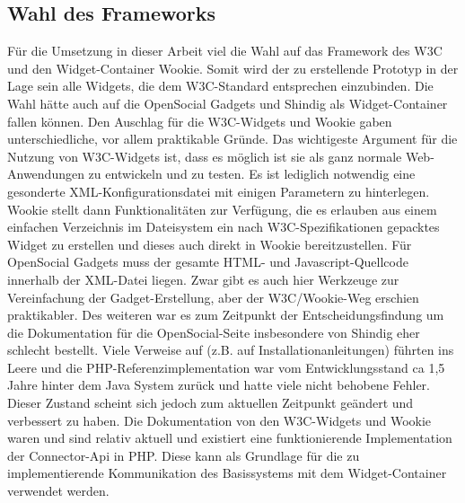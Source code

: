 \subsection{Wahl des Frameworks}
Für die Umsetzung in dieser Arbeit viel die Wahl auf das Framework des W3C und den Widget-Container Wookie. Somit wird der zu erstellende Prototyp in der Lage sein alle Widgets, die dem W3C-Standard entsprechen einzubinden. Die Wahl hätte auch auf die OpenSocial Gadgets und Shindig als Widget-Container fallen können. Den Auschlag für die W3C-Widgets und Wookie gaben unterschiedliche, vor allem praktikable Gründe. Das wichtigeste Argument für die Nutzung von W3C-Widgets ist, dass es möglich ist sie als ganz normale Web-Anwendungen zu entwickeln und zu testen. Es ist lediglich notwendig eine gesonderte XML-Konfigurationsdatei mit einigen Parametern zu hinterlegen. Wookie stellt dann Funktionalitäten zur Verfügung, die es erlauben aus einem einfachen Verzeichnis im Dateisystem ein nach W3C-Spezifikationen gepacktes Widget zu erstellen und dieses auch direkt in Wookie bereitzustellen. Für OpenSocial Gadgets muss der gesamte HTML- und Javascript-Quellcode innerhalb der XML-Datei liegen. Zwar gibt es auch hier Werkzeuge zur Vereinfachung der Gadget-Erstellung, aber der W3C/Wookie-Weg erschien praktikabler. Des weiteren war es zum Zeitpunkt der Entscheidungsfindung um die Dokumentation für die OpenSocial-Seite insbesondere von Shindig eher schlecht bestellt. Viele Verweise auf (z.B. auf Installationanleitungen) führten ins Leere und die PHP-Referenzimplementation war vom Entwicklungsstand ca 1,5 Jahre hinter dem Java System zurück und hatte viele nicht behobene Fehler. Dieser Zustand scheint sich jedoch zum aktuellen Zeitpunkt geändert und verbessert zu haben. Die Dokumentation von den W3C-Widgets und Wookie waren und sind relativ aktuell und existiert eine funktionierende Implementation der Connector-Api in PHP. Diese kann als Grundlage für die zu implementierende Kommunikation des Basissystems mit dem Widget-Container verwendet werden.

